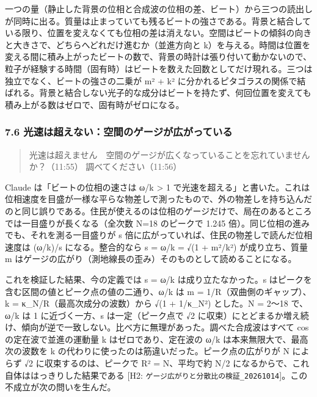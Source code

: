 \documentclass[
  a4paper,
]{ltjsarticle}
\begin{document}
一つの量（静止した背景の位相と合成波の位相の差、ビート）から三つの読出しが同時に出る。質量は止まっていても残るビートの強さである。背景と結合している限り、位置を変えなくても位相の差は消えない。空間はビートの傾斜の向きと大きさで、どちらへどれだけ進むか（並進方向と
k）を与える。時間は位置を変える間に積み上がったビートの数で、背景の時計は張り付いて動かないので、粒子が経験する時間（固有時）はビートを数えた回数としてだけ現れる。三つは独立でなく、ビートの強さの二乗が
m² + k²
に分かれるピタゴラスの関係で結ばれる。背景と結合しない光子的な成分はビートを持たず、何回位置を変えても積み上がる数はゼロで、固有時がゼロになる。

\subsubsection{7.6
光速は超えない：空間のゲージが広がっている}\label{ux5149ux901fux306fux8d85ux3048ux306aux3044ux7a7aux9593ux306eux30b2ux30fcux30b8ux304cux5e83ux304cux3063ux3066ux3044ux308b}

\begin{quote}
光速は超えません　空間のゲージが広くなっていることを忘れていませんか？（11:55）
調べてください（11:56）
\end{quote}

Claude は「ビートの位相の速さは ω/k \textgreater{} 1
で光速を超える」と書いた。これは位相速度を目盛が一様な平らな物差しで測ったもので、外の物差しを持ち込んだのと同じ誤りである。住民が使えるのは位相のゲージだけで、局在のあるところでは一目盛りが長くなる（全次数
N=18 のピークで 1.245 倍）。同じ位相の進みでも、それを測る一目盛りが s
倍に広がっていれば、住民の物差しで読んだ位相速度は (ω/k)/s
になる。整合的なら s = ω/k = √(1 + m²/k²) が成り立ち、質量 m
はゲージの広がり（測地線長の歪み）そのものとして読めることになる。

これを検証した結果、今の定義では s = ω/k は成り立たなかった。s
はピークを含む区間の値とピーク点の値の二通り、ω/k は m =
1/\textbar R\textbar（双曲側のギャップ）、k =
κ\_N/\textbar R\textbar（最高次成分の波数）から √(1 + 1/κ\_N²) とした。N
= 2〜18 で、ω/k は 1 に近づく一方、s は一定（ピーク点で √2
に収束）にとどまるか増え続け、傾向が逆で一致しない。比べ方に無理があった。調べた合成波はすべて
cos の定在波で並進の運動量 k はゼロであり、定在波の ω/k
は本来無限大で、最高次の波数を k
の代わりに使ったのは筋違いだった。ピーク点の広がりが N によらず √2
に収束するのは、ピークで \textbar R\textbar² = N、平均で約 N/2
になるからで、これ自体ははっきりした結果である {[}H2:
\texttt{ゲージ広がりと分散比の検証\_\allowbreak{}20261014}{]}。この不成立が次の問いを生んだ。
\end{document}

